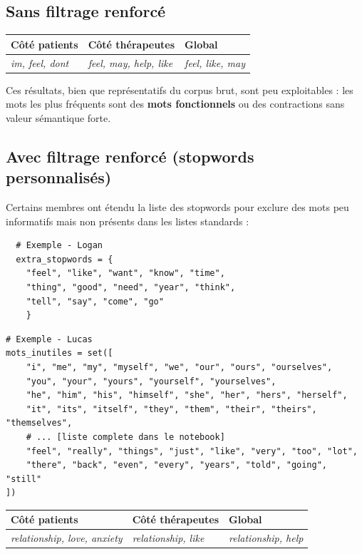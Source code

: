 \documentclass[12pt,a4paper]{article}
\begin{document}
\subsection{Sans filtrage renforcé}

\begin{center}
\begin{tabular}{lll}
\toprule
\textbf{Côté patients} & \textbf{Côté thérapeutes} & \textbf{Global} \\
\midrule
\textit{im, feel, dont} & \textit{feel, may, help, like} & \textit{feel, like, may} \\
\bottomrule
\end{tabular}
\end{center}

Ces résultats, bien que représentatifs du corpus brut, sont peu exploitables : les mots les plus fréquents sont des \textbf{mots fonctionnels} ou des contractions sans valeur sémantique forte.

\subsection{Avec filtrage renforcé (stopwords personnalisés)}

Certains membres ont étendu la liste des stopwords pour exclure des mots peu informatifs mais non présents dans les listes standards :

\begin{lstlisting}
  # Exemple - Logan
  extra_stopwords = {
    "feel", "like", "want", "know", "time",
    "thing", "good", "need", "year", "think",
    "tell", "say", "come", "go"
    }
  \end{lstlisting}
  
\begin{lstlisting}
# Exemple - Lucas
mots_inutiles = set([
    "i", "me", "my", "myself", "we", "our", "ours", "ourselves",
    "you", "your", "yours", "yourself", "yourselves",
    "he", "him", "his", "himself", "she", "her", "hers", "herself",
    "it", "its", "itself", "they", "them", "their", "theirs", "themselves",
    # ... [liste complete dans le notebook]
    "feel", "really", "things", "just", "like", "very", "too", "lot",
    "there", "back", "even", "every", "years", "told", "going", "still"
])
\end{lstlisting}

\begin{center}
\begin{tabular}{lll}
\toprule
\textbf{Côté patients} & \textbf{Côté thérapeutes} & \textbf{Global} \\
\midrule
\textit{relationship, love, anxiety} & \textit{relationship, like} & \textit{relationship, help} \\
\bottomrule
\end{tabular}
\end{center}
\end{document}
